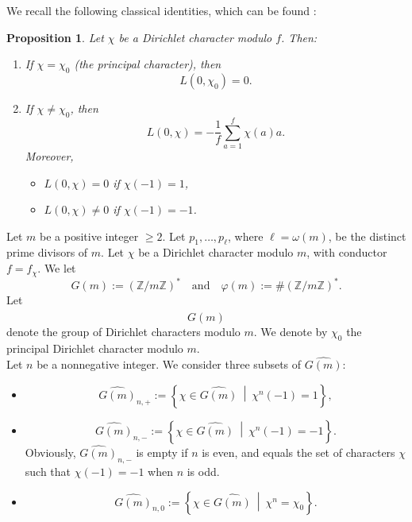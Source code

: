 \documentclass[12pt]{amsart}
\newtheorem{proposition}[theorem]{Proposition}
\begin{document}
 
 

 


 
  

We recall the following classical identities, which can be found \cite{ApostolNumberTheory}:
\begin{proposition}
Let $\chi$ be a Dirichlet character modulo $f$. Then:
\begin{enumerate}
    \item If $\chi = \chi_0$ (the principal character), then
    \[
    L(0, \chi_0) = 0.
    \]


    \item If $\chi \neq \chi_0$, then
    \[
    L(0, \chi) = -\frac{1}{f} \sum_{a=1}^f \chi(a) a.
    \]
    Moreover,
    \begin{itemize}
        \item $L(0, \chi) = 0$ if $\chi(-1) = 1$,
        \item $L(0, \chi) \ne 0$ if $\chi(-1) = -1$.
    \end{itemize}
\end{enumerate}
\end{proposition}
 
 
 
\bigskip
 
 

Let $m$ be a positive integer $\geq 2$.  Let $p_1,\ldots,p_\ell$, where $\ell = \omega(m)$, be the distinct prime divisors of $m$. Let $\chi$ be a Dirichlet character modulo $m$, with conductor $f = f_\chi$. We let
\[
G(m) := (\mathbb{Z}/m\mathbb{Z})^\ast \quad \text{and} \quad \varphi(m) := \#(\mathbb{Z}/m\mathbb{Z})^\ast.
\]
Let
\[
\widehat{G(m)}
\]
denote the group of Dirichlet characters modulo $m$. We denote by $\chi_0$ the principal Dirichlet character modulo $m$. \\

Let $n$ be a nonnegative integer. We consider three subsets of $\widehat{G(m)}$:


\begin{itemize}
    \item 
    \[
    \widehat{G(m)}_{n,+} := \left\{ \chi \in \widehat{G(m)} \ \middle|\ \chi^n(-1) = 1 \right\},
    \]
    \item 
    \[
    \widehat{G(m)}_{n,-} := \left\{ \chi \in \widehat{G(m)} \ \middle|\ \chi^n(-1) = -1 \right\}.
    \]
    Obviously, $\widehat{G(m)}_{n,-}$ is empty if $n$ is even, and equals the set of characters $\chi$ such that $\chi(-1) = -1$ when $n$ is odd.
    \item 
    \[
    \widehat{G(m)}_{n,0} := \left\{ \chi \in \widehat{G(m)} \ \middle|\ \chi^n = \chi_0 \right\}.
    \]
\end{itemize}
\end{document}
